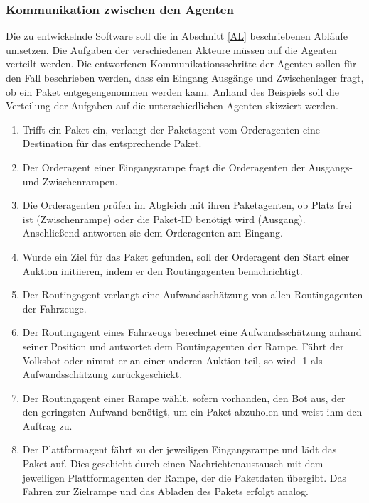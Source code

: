 \subsubsection{Kommunikation zwischen den Agenten}
Die zu entwickelnde Software soll die in Abschnitt \ref{AL} beschriebenen Abläufe umsetzen. Die Aufgaben der verschiedenen Akteure müssen auf die Agenten verteilt werden. Die entworfenen Kommunikationsschritte der Agenten sollen für den Fall beschrieben werden, dass ein Eingang Ausgänge und Zwischenlager fragt, ob ein Paket entgegengenommen werden kann. Anhand des Beispiels soll die Verteilung der Aufgaben auf die unterschiedlichen Agenten skizziert werden.
\begin{enumerate}
\item Trifft ein Paket ein, verlangt der Paketagent vom Orderagenten eine Destination für das entsprechende Paket.
\item Der Orderagent einer Eingangsrampe fragt die Orderagenten der Ausgangs- und Zwischenrampen.
\item Die Orderagenten prüfen im Abgleich mit ihren Paketagenten, ob Platz frei ist (Zwischenrampe) oder die Paket-ID benötigt wird (Ausgang). Anschließend antworten sie dem Orderagenten am Eingang.  
\item Wurde ein Ziel für das Paket gefunden, soll der Orderagent den Start einer Auktion initiieren, indem er den Routingagenten benachrichtigt. 
\item Der Routingagent verlangt eine Aufwandsschätzung von allen Routingagenten der Fahrzeuge.
\item Der Routingagent eines Fahrzeugs berechnet eine Aufwandsschätzung anhand seiner Position und antwortet dem Routingagenten der Rampe. Fährt der Volksbot oder nimmt er an einer anderen Auktion teil, so wird -1 als Aufwandsschätzung zurückgeschickt.
\item Der Routingagent einer Rampe wählt, sofern vorhanden, den Bot aus, der den geringsten Aufwand benötigt, um ein Paket abzuholen und weist ihm den Auftrag zu.
\item Der Plattformagent fährt zu der jeweiligen Eingangsrampe und lädt das Paket auf. Dies geschieht durch einen Nachrichtenaustausch mit dem jeweiligen Plattformagenten der Rampe, der die Paketdaten übergibt. Das Fahren zur Zielrampe und das Abladen des Pakets erfolgt analog. 
\end{enumerate}
